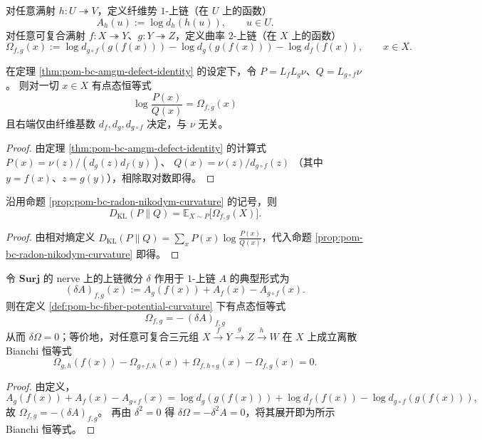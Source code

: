 \begin{definition}[纤维势与曲率 \(2\)-上链]\label{def:pom-bc-fiber-potential-curvature}
对任意满射 \(h:U\twoheadrightarrow V\)，定义纤维势 \(1\)-上链（在 \(U\) 上的函数）
\[
A_h(u):=\log d_h(h(u)),\qquad u\in U.
\]
对任意可复合满射 \(f:X\twoheadrightarrow Y\)、\(g:Y\twoheadrightarrow Z\)，定义曲率 \(2\)-上链（在 \(X\) 上的函数）
\[
\Omega_{f,g}(x):=\log d_{g\circ f}(g(f(x)))-\log d_g(g(f(x)))-\log d_f(f(x)),\qquad x\in X.
\]
\end{definition}

\begin{proposition}\label{prop:pom-bc-radon-nikodym-curvature}
在定理 \ref{thm:pom-bc-amgm-defect-identity} 的设定下，令 \(P=L_fL_g\nu\)、\(Q=L_{g\circ f}\nu\)。
则对一切 \(x\in X\) 有点态恒等式
\[
\boxed{\;\log\frac{P(x)}{Q(x)}=\Omega_{f,g}(x)\;}
\]
且右端仅由纤维基数 \(d_f,d_g,d_{g\circ f}\) 决定，与 \(\nu\) 无关。
\end{proposition}
\begin{proof}
由定理 \ref{thm:pom-bc-amgm-defect-identity} 的计算式
\(
P(x)=\nu(z)/(d_g(z)d_f(y))
\)、
\(
Q(x)=\nu(z)/d_{g\circ f}(z)
\)
（其中 \(y=f(x)\)、\(z=g(y)\)），相除取对数即得。
\end{proof}

\begin{corollary}[缺陷作为曲率的可观测平均]\label{cor:pom-bc-kl-as-curvature-average}
沿用命题 \ref{prop:pom-bc-radon-nikodym-curvature} 的记号，则
\[
\boxed{\;
D_{\mathrm{KL}}(P\|Q)=\mathbb E_{X\sim P}\bigl[\Omega_{f,g}(X)\bigr].\;}
\]
\end{corollary}
\begin{proof}
由相对熵定义 \(D_{\mathrm{KL}}(P\|Q)=\sum_x P(x)\log\frac{P(x)}{Q(x)}\)，代入命题 \ref{prop:pom-bc-radon-nikodym-curvature} 即得。
\end{proof}

\begin{proposition}\label{prop:pom-bc-bianchi}
令 \(\mathbf{Surj}\) 的 nerve 上的上链微分 \(\delta\) 作用于 \(1\)-上链 \(A\) 的典型形式为
\[
(\delta A)_{f,g}(x):=A_g(f(x))+A_f(x)-A_{g\circ f}(x).
\]
则在定义 \ref{def:pom-bc-fiber-potential-curvature} 下有点态恒等式
\[
\boxed{\;\Omega_{f,g}=-\,(\delta A)_{f,g}\;}
\]
从而 \(\delta\Omega=0\)；等价地，对任意可复合三元组
\(
X\xrightarrow{f}Y\xrightarrow{g}Z\xrightarrow{h}W
\)
在 \(X\) 上成立离散 Bianchi 恒等式
\[
\Omega_{g,h}(f(x))-\Omega_{g\circ f,h}(x)+\Omega_{f,h\circ g}(x)-\Omega_{f,g}(x)=0.
\]
\end{proposition}
\begin{proof}
由定义，
\[
A_g(f(x))+A_f(x)-A_{g\circ f}(x)
=\log d_g(g(f(x)))+\log d_f(f(x))-\log d_{g\circ f}(g(f(x))),
\]
故 \(\Omega_{f,g}=-(\delta A)_{f,g}\)。
再由 \(\delta^2=0\) 得 \(\delta\Omega=-\delta^2A=0\)，将其展开即为所示 Bianchi 恒等式。
\end{proof}

